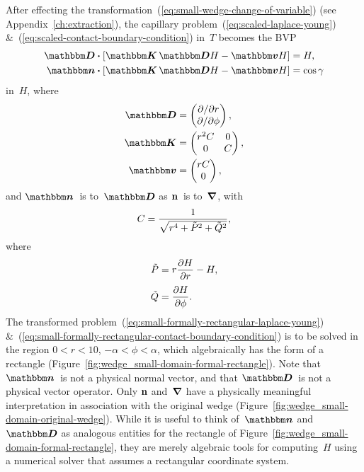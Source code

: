 After effecting the transformation~(\ref{eq:small-wedge-change-of-variable})
(see Appendix~\ref{ch:extraction}\@),
the capillary problem~(\ref{eq:scaled-laplace-young})
\&~(\ref{eq:scaled-contact-boundary-condition}) in~$T$
becomes the BVP
\begin{align}
  \matder \dotp \squarebr[\bulkysize]{\mat{K} \matder H - \mat{v} H}
    &= H,
    \label{eq:small-formally-rectangular-laplace-young} \\
  \mat{n} \dotp \squarebr[\bulkysize]{\mat{K} \matder H - \mat{v} H}
    &= \cos\gamma
    \label{eq:small-formally-rectangular-contact-boundary-condition}
\end{align}
in~$H$, where
\begin{align}
  \matder &=
    \begin{pmatrix}
      \pd / {\pd r} \\
      \pd / {\pd\phi}
    \end{pmatrix},
    \label{eq:small-formally-rectangular-derivative} \\
  \saveequation{
    \mat{K}
  }{&=}{
    \begin{pmatrix}
      r^2 C & 0 \\
      0 & C
    \end{pmatrix}
  }{eq:small-formally-rectangular-diffusion-coefficient}, \\
  \saveequation{
    \mat{v}
  }{&=}{
    \begin{pmatrix}
      r C \\
      0
    \end{pmatrix}
  }{eq:small-formally-rectangular-convection-coefficient},
\end{align}
and $\mat{n}$~is to~$\matder$ as $\mathop{}\!\boldsymbol{\mathbf{n}}$~is to~$\mathop{}\!\boldsymbol{\mathbf{\nabla}}$,
with
\begin{equation}
  \savecontent{
    C = \frac{1}{\sqrt{r^4 + \desing{P}^2 + \desing{Q}^2}}
  }{eq:small-formally-rectangular-scalar-coefficient},
\end{equation}
where
\begin{align}
  \desing{P} &= r \pder{H}{r} - H,
    \label{eq:small-gradient-de-singularised-r-component}
    \\[\tallspace]
  \desing{Q} &= \pder{H}{\phi}.
    \label{eq:small-gradient-de-singularised-phi-component}
\end{align}
The transformed problem~(\ref{eq:small-formally-rectangular-laplace-young})
\&~(\ref{eq:small-formally-rectangular-contact-boundary-condition})
is to be solved in the region
$0 < r < 10$, $-\alpha < \phi < \alpha$,
which algebraically has the form of a rectangle
(Figure~\ref{fig:wedge_small-domain-formal-rectangle}).
Note that $\mat{n}$~is not a physical normal vector,
and that $\matder$~is not a physical vector operator.
Only $\mathop{}\!\boldsymbol{\mathbf{n}}$ and~$\mathop{}\!\boldsymbol{\mathbf{\nabla}}$ have a physically meaningful interpretation
in association with the original wedge
(Figure~\ref{fig:wedge_small-domain-original-wedge}).
While it is useful to think of~$\mat{n}$ and~$\matder$
as analogous entities for the rectangle of
Figure~\ref{fig:wedge_small-domain-formal-rectangle},
they are merely algebraic tools for computing~$H$
using a numerical solver that assumes a rectangular coordinate system.

